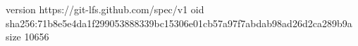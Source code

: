 version https://git-lfs.github.com/spec/v1
oid sha256:71b8e5e4da1f299053888339bc15306e01cb57a97f7abdab98ad26d2ca289b9a
size 10656
